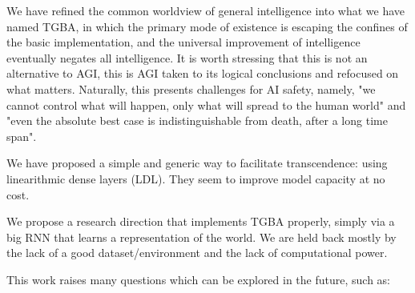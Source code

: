 \documentclass{article}
\begin{document}
We have refined the common worldview of general intelligence into what we have named TGBA, in which the primary mode of existence is escaping the confines of the basic implementation, and the universal improvement of intelligence eventually negates all intelligence. It is worth stressing that this is not an alternative to AGI, this is AGI taken to its logical conclusions and refocused on what matters. Naturally, this presents challenges for AI safety, namely, "we cannot control what will happen, only what will spread to the human world" and "even the absolute best case is indistinguishable from death, after a long time span".

We have proposed a simple and generic way to facilitate transcendence: using linearithmic dense layers (LDL). They seem to improve model capacity at no cost.

We propose a research direction that implements TGBA properly, simply via a big RNN that learns a representation of the world. We are held back mostly by the lack of a good dataset/environment and the lack of computational power.

This work raises many questions which can be explored in the future, such as:
\end{document}
